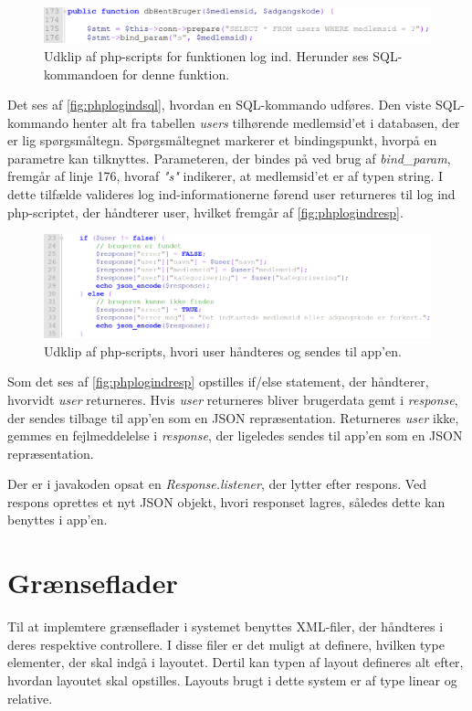 \begin{figure} [H]
\centering
\includegraphics[width=1\textwidth]{figures/imple/phplogindsql}
\caption{Udklip af php-scripts for funktionen log ind. Herunder ses SQL-kommandoen for denne funktion.}
\label{fig:phplogindsql}
\end{figure}

\noindent
Det ses af \autoref{fig:phplogindsql}, hvordan en SQL-kommando udføres. Den viste SQL-kommando henter alt fra tabellen \textit{users} tilhørende medlemsid'et i databasen, der er lig spørgsmåltegn. Spørgsmåltegnet markerer et bindingspunkt, hvorpå en parametre kan tilknyttes. Parameteren, der bindes på ved brug af \textit{bind\_param}, fremgår af linje 176, hvoraf \textit{"s"} indikerer, at medlemsid'et er af typen string. I dette tilfælde valideres log ind-informationerne førend user returneres til log ind php-scriptet, der håndterer user, hvilket fremgår af \autoref{fig:phplogindresp}.


\begin{figure} [H]
\centering
\includegraphics[width=1\textwidth]{figures/imple/phplogindresp}
\caption{Udklip af php-scripts, hvori user håndteres og sendes til app'en.}
\label{fig:phplogindresp}
\end{figure}

\noindent
Som det ses af \autoref{fig:phplogindresp} opstilles if/else statement, der håndterer, hvorvidt \textit{user} returneres. Hvis \textit{user} returneres bliver brugerdata gemt i \textit{response}, der sendes tilbage til app'en som en JSON repræsentation. Returneres \textit{user} ikke, gemmes en fejlmeddelelse i \textit{response}, der ligeledes sendes til app'en som en JSON repræsentation. 

Der er i javakoden opsat en \textit{Response.listener}, der lytter efter respons. Ved respons oprettes et nyt JSON objekt, hvori responset lagres, således dette kan benyttes i app'en. 


\section{Grænseflader}
Til at implemtere grænseflader i systemet benyttes XML-filer, der håndteres i deres respektive controllere. I disse filer er det muligt at definere, hvilken type elementer, der skal indgå i layoutet. Dertil kan typen af layout defineres alt efter, hvordan layoutet skal opstilles. Layouts brugt i dette system er af type linear og relative.  

